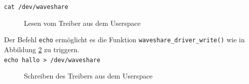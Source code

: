 \texttt{cat /dev/waveshare} \\

\begin{figure}[H]
  \centering
  \caption{Lesen vom Treiber aus dem Userspace}
  \label{pic:cat_read}
\end{figure}

Der Befehl \texttt{echo} ermöglicht es die Funktion \texttt{waveshare_driver_write()} wie in Abbildung \ref{pic:echo_write} zu triggern. \\

\texttt{echo hallo > /dev/waveshare} \\

\begin{figure}[H]
  \centering
  \caption{Schreiben des Treibers aus dem Userspace}
  \label{pic:echo_write}
\end{figure}

